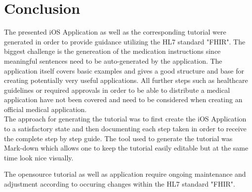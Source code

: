 \documentclass{article}
\begin{document}
\part{Conclusion}
The presented iOS Application as well as the corresponding tutorial were generated in order to provide guidance utilizing the HL7 standard "FHIR". The biggest challenge is the genereation of the medication instructions since meaningful sentences need to be auto-generated by the application. The application itself covers basic examples and gives a good structure and base for creating potentially very useful applications. All further steps such as healthcare guidelines or required approvals in order to be able to distribute a medical application have not been covered and need to be considered when creating an official medical application.
\\
The approach for generating the tutorial was to first create the iOS Application to a satisfactory state and then documenting each step taken in order to receive the complete step by step guide. The tool used to generate the tutorial was Mark-down which allows one to keep the tutorial easily editable but at the same time look nice visually.

The opensource tutorial as well as application require ongoing maintenance and adjustment according to occuring changes within the HL7 standard "FHIR".



\end{document}
